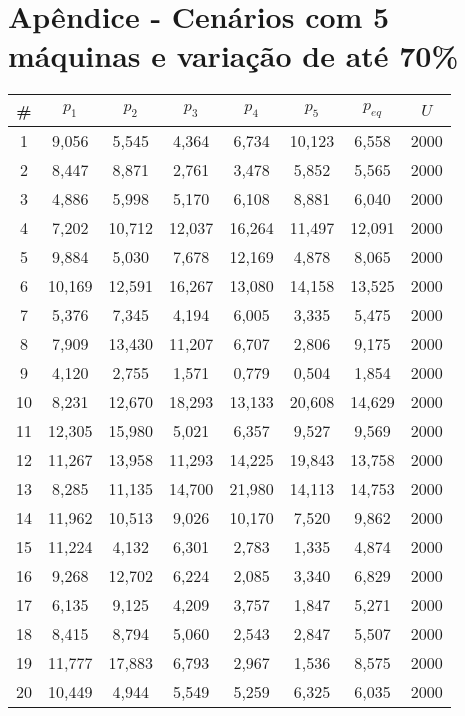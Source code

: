 \newpage
\section{Apêndice - Cenários com 5 máquinas e variação de até 70\%}\label{app:tab05machine70}
\begin{longtable}{cccccccc}
\hline
\#  & $p_1$  & $p_2$  & $p_3$  & $p_4$  & $p_5$  & $p_{eq}$  & $U$    \\ \hline
1   & 9,056  & 5,545  & 4,364  & 6,734  & 10,123 & 6,558  & 2000 \\
2   & 8,447  & 8,871  & 2,761  & 3,478  & 5,852  & 5,565  & 2000 \\
3   & 4,886  & 5,998  & 5,170  & 6,108  & 8,881  & 6,040  & 2000 \\
4   & 7,202  & 10,712 & 12,037 & 16,264 & 11,497 & 12,091 & 2000 \\
5   & 9,884  & 5,030  & 7,678  & 12,169 & 4,878  & 8,065  & 2000 \\
6   & 10,169 & 12,591 & 16,267 & 13,080 & 14,158 & 13,525 & 2000 \\
7   & 5,376  & 7,345  & 4,194  & 6,005  & 3,335  & 5,475  & 2000 \\
8   & 7,909  & 13,430 & 11,207 & 6,707  & 2,806  & 9,175  & 2000 \\
9   & 4,120  & 2,755  & 1,571  & 0,779  & 0,504  & 1,854  & 2000 \\
10  & 8,231  & 12,670 & 18,293 & 13,133 & 20,608 & 14,629 & 2000 \\
11  & 12,305 & 15,980 & 5,021  & 6,357  & 9,527  & 9,569  & 2000 \\
12  & 11,267 & 13,958 & 11,293 & 14,225 & 19,843 & 13,758 & 2000 \\
13  & 8,285  & 11,135 & 14,700 & 21,980 & 14,113 & 14,753 & 2000 \\
14  & 11,962 & 10,513 & 9,026  & 10,170 & 7,520  & 9,862  & 2000 \\
15  & 11,224 & 4,132  & 6,301  & 2,783  & 1,335  & 4,874  & 2000 \\
16  & 9,268  & 12,702 & 6,224  & 2,085  & 3,340  & 6,829  & 2000 \\
17  & 6,135  & 9,125  & 4,209  & 3,757  & 1,847  & 5,271  & 2000 \\
18  & 8,415  & 8,794  & 5,060  & 2,543  & 2,847  & 5,507  & 2000 \\
19  & 11,777 & 17,883 & 6,793  & 2,967  & 1,536  & 8,575  & 2000 \\
20  & 10,449 & 4,944  & 5,549  & 5,259  & 6,325  & 6,035  & 2000 \\

\end{longtable}
